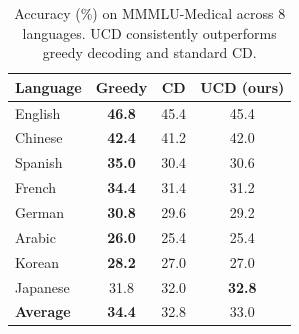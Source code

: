 \begin{table}[t]
\centering
\small
\begin{tabular}{lccc}
\toprule
Language & Greedy & CD & UCD (ours) \\
\midrule
English & \textbf{46.8} & 45.4 & 45.4 \\
Chinese & \textbf{42.4} & 41.2 & 42.0 \\
Spanish & \textbf{35.0} & 30.4 & 30.6 \\
French & \textbf{34.4} & 31.4 & 31.2 \\
German & \textbf{30.8} & 29.6 & 29.2 \\
Arabic & \textbf{26.0} & 25.4 & 25.4 \\
Korean & \textbf{28.2} & 27.0 & 27.0 \\
Japanese & 31.8 & 32.0 & \textbf{32.8} \\
\midrule
\textbf{Average} & \textbf{34.4} & 32.8 & 33.0 \\
\bottomrule
\end{tabular}
\caption{Accuracy (\%) on MMMLU-Medical across 8 languages. UCD consistently outperforms greedy decoding and standard CD.}
\label{tab:mmmlu_medical_main}
\end{table}